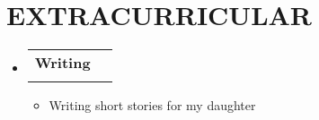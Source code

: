 \documentclass[letterpaper,11pt]{article}
\makeatletter
\newcommand{\resumeItem}[1]{
  \item\small{
    {#1 \vspace{-1pt}}
  }
}
\newcommand{\resumeSubheading}[4]{
  \vspace{-2pt}\item
    \begin{tabular*}{1.0\textwidth}[t]{l@{\extracolsep{\fill}}r}
      \textbf{\large#1} & \textbf{\small #2} \\
      \textit{\large#3} & \textit{\small #4} \\
      
    \end{tabular*}\vspace{-3pt}
}
\newcommand{\resumeSubHeadingListStart}{\begin{itemize}[leftmargin=0.0in, label={}]}
\newcommand{\resumeSubHeadingListEnd}{\end{itemize}}
\newcommand{\resumeItemListStart}{\begin{itemize}}
\newcommand{\resumeItemListEnd}{\end{itemize}\vspace{-5pt}}
\makeatother
\begin{document}
\section{EXTRACURRICULAR}
\resumeSubHeadingListStart
\resumeSubheading{Writing }{}{\underline{}}{}
\resumeItemListStart
\resumeItem{\normalsize{Writing short stories for my daughter \textbf{}}}

\resumeItemListEnd
\resumeSubHeadingListEnd
\vspace{0pt}

\end{document}
